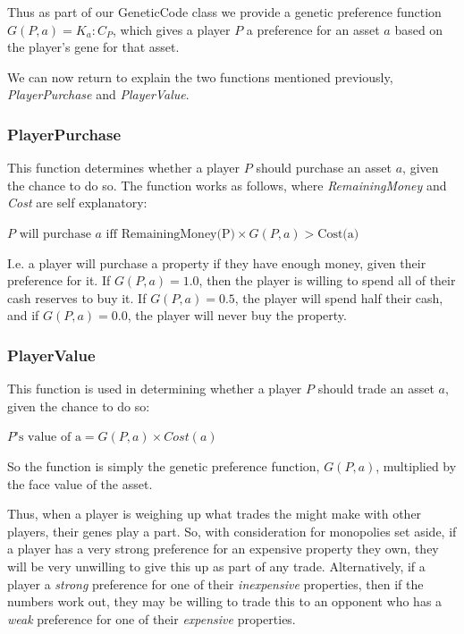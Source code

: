 \documentclass[11pt,a4paper,twocolumn]{scrartcl}
\begin{document}
Thus as part of our GeneticCode class we provide a genetic preference function $G(P,a) = K_a : C_P$, which gives a player $P$ a preference for an asset $a$ based on the player's gene for that asset. 

We can now return to explain the two functions mentioned previously, \textit{PlayerPurchase} and \textit{PlayerValue}.

\subsubsection{PlayerPurchase}

This function determines whether a player $P$ should purchase an asset $a$, given the chance to do so. The function works as follows, where \textit{RemainingMoney} and \textit{Cost} are self explanatory:

$P \text{ will purchase } a \text{ iff } \text{RemainingMoney(P)} \times G(P,a) > \text{Cost(a)}$

I.e. a player will purchase a property if they have enough money, given their preference for it. If $G(P,a) = 1.0$, then the player is willing to spend all of their cash reserves to buy it. If $G(P,a) = 0.5$, the player will spend half their cash, and if $G(P,a) = 0.0$, the player will never buy the property.

\subsubsection{PlayerValue}

This function is used in determining whether a player $P$ should trade an asset $a$, given the chance to do so:

$P \text{'s value of a} = G(P,a) \times Cost(a)$

So the function is simply the genetic preference function, $G(P,a)$, multiplied by the face value of the asset.

Thus, when a player is weighing up what trades the might make with other players, their genes play a part. So, with consideration for monopolies set aside, if a player has a very strong preference for an expensive property they own, they will be very unwilling to give this up as part of any trade. Alternatively, if a player a \textit{strong} preference for one of their \textit{inexpensive} properties, then if the numbers work out, they may be willing to trade this to an opponent who has a \textit{weak} preference for one of their \textit{expensive} properties.
\end{document}
